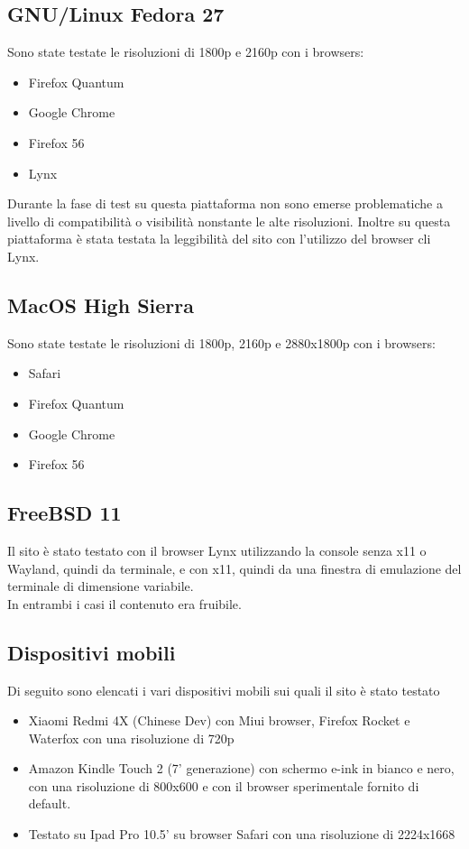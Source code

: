 \documentclass[openany, a4paper, 12pt]{report}
\begin{document}
				\subsection{GNU/Linux Fedora 27}
				Sono state testate le risoluzioni di 1800p e 2160p con i browsers:
				\begin{itemize}
					\item Firefox Quantum
					\item Google Chrome
					\item Firefox 56
					\item Lynx
				\end{itemize}
				Durante la fase di test su questa piattaforma non sono emerse problematiche a livello di compatibilità o visibilità nonstante le alte risoluzioni. Inoltre su questa piattaforma è stata testata la leggibilità del sito con l'utilizzo del browser cli Lynx.

				\subsection{MacOS High Sierra}
				Sono state testate le risoluzioni di 1800p, 2160p e 2880x1800p con i browsers:
				\begin{itemize}
					\item Safari
					\item Firefox Quantum
					\item Google Chrome
					\item Firefox 56
				\end{itemize}

				\subsection{FreeBSD 11}
				Il sito è stato testato con il browser Lynx utilizzando la console senza x11 o Wayland, quindi da terminale, e con x11, quindi da una finestra di emulazione del terminale di dimensione variabile.\\
				In entrambi i casi il contenuto era fruibile.

				\subsection{Dispositivi mobili}
				Di seguito sono elencati i vari dispositivi mobili sui quali il sito è stato testato
				\begin{itemize}
				\item Xiaomi Redmi 4X (Chinese Dev) con Miui browser, Firefox Rocket e Waterfox con una risoluzione di 720p
				\item Amazon Kindle Touch 2 (7' generazione) con schermo e-ink in bianco e nero, con una risoluzione di 800x600 e con il browser sperimentale fornito di default.
        		\item Testato su Ipad Pro 10.5' su browser Safari con una risoluzione di 2224x1668 %
				\end{itemize}
			
\end{document}
